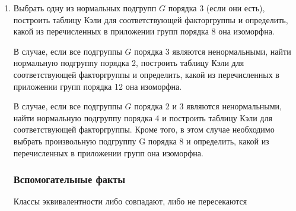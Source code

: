 \documentclass[11pt, fleqn]{article}
\begin{document}
\begin{enumerate}
\[\begin{pmatrix}
          1 & 3\\
          2 & 3
      \end{pmatrix},\ \begin{pmatrix}
          1 & 0\\
          1 & 1
      \end{pmatrix},\ \begin{pmatrix}
          0 & 1\\
          3 & 2
      \end{pmatrix} \right\} = \ol{\begin{pmatrix}
          1 & 0\\
          1 & 1
      \end{pmatrix}} = \ol{\begin{pmatrix}
          0 & 1\\
          3 & 2
      \end{pmatrix}}\]
      \subsection{Третий пункт}
      \subsubsection{Формулировка}
      \item Выбрать одну из нормальных подгрупп $G$ порядка 3 (если они есть),
      построить таблицу Кэли для соответствующей факторгруппы и определить, какой из перечисленных в приложении групп порядка 8 она изоморфна.

      В случае, если все подгруппы $G$ порядка 3 являются ненормальными,
      найти нормальную подгруппу порядка 2, построить таблицу Кэли для
      соответствующей факторгруппы и определить, какой из перечисленных в приложении групп порядка 12 она изоморфна.

      В случае, если все подгруппы $G$ порядка 2 и 3 являются ненормальными, найти нормальную подгруппу порядка 4 и построить таблицу Кэли для соответствующей факторгруппы. Кроме того, в этом случае
      необходимо выбрать произвольную подгруппу G порядка 8 и определить, какой из перечисленных в приложении групп она изоморфна.
      \subsubsection{Вспомогательные факты}
      \begin{utv}
          Классы эквивалентности либо совпадают, либо не пересекаются
      \end{utv}

\end{enumerate}
\end{document}
